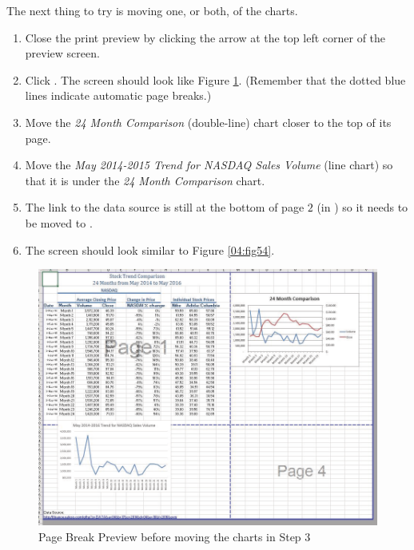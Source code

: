 The next thing to try is moving one, or both, of the charts. 

\begin{enumerate}
	\item Close the print preview by clicking the arrow at the top left corner of the preview screen.
	\item Click . The screen should look like Figure \ref{04:fig53}. (Remember that the dotted blue lines indicate automatic page breaks.)
	\item Move the \textit{24 Month Comparison} (double-line) chart closer to the top of its page.
	\item Move the \textit{May 2014-2015 Trend for NASDAQ Sales Volume} (line chart) so that it is under the \textit{24 Month Comparison} chart.
	\item The link to the data source is still at the bottom of page $ 2 $ (in ) so it needs to be moved to .
	\item The screen should look similar to Figure \ref{04:fig54}.
\end{enumerate}

\begin{figure}[H]
	\centering
	\includegraphics[width=\maxwidth{.95\linewidth}]{gfx/ch04_fig53}
	\caption{Page Break Preview before moving the charts in Step 3}
	\label{04:fig53}
\end{figure}

